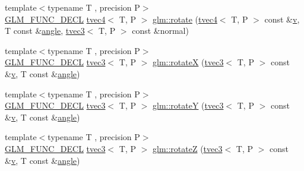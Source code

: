 \begin{DoxyCompactItemize}
\item 
{\footnotesize template$<$typename T , precision P$>$ }\\\mbox{\hyperlink{setup_8hpp_ab2d052de21a70539923e9bcbf6e83a51}{G\+L\+M\+\_\+\+F\+U\+N\+C\+\_\+\+D\+E\+CL}} \mbox{\hyperlink{structglm_1_1tvec4}{tvec4}}$<$ T, P $>$ \mbox{\hyperlink{group__gtx__rotate__vector_gaf4d59dd2f668f9ffb38048055d1316bd}{glm\+::rotate}} (\mbox{\hyperlink{structglm_1_1tvec4}{tvec4}}$<$ T, P $>$ const \&\mbox{\hyperlink{glad_8h_a14cfbe2fc2234f5504618905b69d1e06}{v}}, T const \&\mbox{\hyperlink{group__gtc__quaternion_gad4a4448baedb198b2b1e7880d2544dc9}{angle}}, \mbox{\hyperlink{structglm_1_1tvec3}{tvec3}}$<$ T, P $>$ const \&normal)
\item 
{\footnotesize template$<$typename T , precision P$>$ }\\\mbox{\hyperlink{setup_8hpp_ab2d052de21a70539923e9bcbf6e83a51}{G\+L\+M\+\_\+\+F\+U\+N\+C\+\_\+\+D\+E\+CL}} \mbox{\hyperlink{structglm_1_1tvec3}{tvec3}}$<$ T, P $>$ \mbox{\hyperlink{group__gtx__rotate__vector_ga0c2dc9f8507bffcbb957db9818b18508}{glm\+::rotateX}} (\mbox{\hyperlink{structglm_1_1tvec3}{tvec3}}$<$ T, P $>$ const \&\mbox{\hyperlink{glad_8h_a14cfbe2fc2234f5504618905b69d1e06}{v}}, T const \&\mbox{\hyperlink{group__gtc__quaternion_gad4a4448baedb198b2b1e7880d2544dc9}{angle}})
\item 
{\footnotesize template$<$typename T , precision P$>$ }\\\mbox{\hyperlink{setup_8hpp_ab2d052de21a70539923e9bcbf6e83a51}{G\+L\+M\+\_\+\+F\+U\+N\+C\+\_\+\+D\+E\+CL}} \mbox{\hyperlink{structglm_1_1tvec3}{tvec3}}$<$ T, P $>$ \mbox{\hyperlink{group__gtx__rotate__vector_gabb5d19eba5befeebcb35a0aad4a114e3}{glm\+::rotateY}} (\mbox{\hyperlink{structglm_1_1tvec3}{tvec3}}$<$ T, P $>$ const \&\mbox{\hyperlink{glad_8h_a14cfbe2fc2234f5504618905b69d1e06}{v}}, T const \&\mbox{\hyperlink{group__gtc__quaternion_gad4a4448baedb198b2b1e7880d2544dc9}{angle}})
\item 
{\footnotesize template$<$typename T , precision P$>$ }\\\mbox{\hyperlink{setup_8hpp_ab2d052de21a70539923e9bcbf6e83a51}{G\+L\+M\+\_\+\+F\+U\+N\+C\+\_\+\+D\+E\+CL}} \mbox{\hyperlink{structglm_1_1tvec3}{tvec3}}$<$ T, P $>$ \mbox{\hyperlink{group__gtx__rotate__vector_gae30ac01b89d4f16a972fee696c964908}{glm\+::rotateZ}} (\mbox{\hyperlink{structglm_1_1tvec3}{tvec3}}$<$ T, P $>$ const \&\mbox{\hyperlink{glad_8h_a14cfbe2fc2234f5504618905b69d1e06}{v}}, T const \&\mbox{\hyperlink{group__gtc__quaternion_gad4a4448baedb198b2b1e7880d2544dc9}{angle}})
\item 

\end{DoxyCompactItemize}
